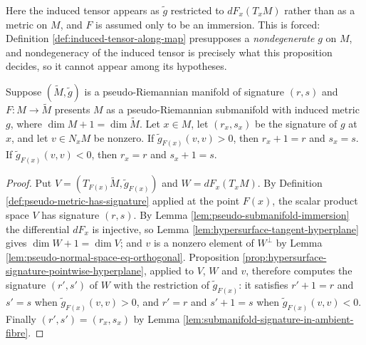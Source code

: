 Here the induced tensor appears as $\tilde{g}$ restricted to $dF_x(T_xM)$ rather than as a metric on $M$, and $F$ is assumed only to be an immersion. This is forced: Definition \ref{def:induced-tensor-along-map} presupposes a \emph{nondegenerate} $g$ on $M$, and nondegeneracy of the induced tensor is precisely what this proposition decides, so it cannot appear among its hypotheses.

\begin{proposition}
\label{prop:hypersurface-signature-at-a-point}
\leanok
{}
Suppose $(\tilde{M},\tilde{g})$ is a pseudo-Riemannian manifold of signature $(r,s)$ and $F : M \to \tilde{M}$ presents $M$ as a pseudo-Riemannian submanifold with induced metric $g$, where $\dim M + 1 = \dim\tilde{M}$. Let $x \in M$, let $(r_x,s_x)$ be the signature of $g$ at $x$, and let $v \in N_xM$ be nonzero. If $\tilde{g}_{F(x)}(v,v) > 0$, then $r_x + 1 = r$ and $s_x = s$. If $\tilde{g}_{F(x)}(v,v) < 0$, then $r_x = r$ and $s_x + 1 = s$.
\end{proposition}

\begin{proof}
\leanok
{}
Put $V = (T_{F(x)}\tilde{M}, \tilde{g}_{F(x)})$ and $W = dF_x(T_xM)$. By Definition \ref{def:pseudo-metric-has-signature} applied at the point $F(x)$, the scalar product space $V$ has signature $(r,s)$. By Lemma \ref{lem:pseudo-submanifold-immersion} the differential $dF_x$ is injective, so Lemma \ref{lem:hypersurface-tangent-hyperplane} gives $\dim W + 1 = \dim V$; and $v$ is a nonzero element of $W^\perp$ by Lemma \ref{lem:pseudo-normal-space-eq-orthogonal}. Proposition \ref{prop:hypersurface-signature-pointwise-hyperplane}, applied to $V$, $W$ and $v$, therefore computes the signature $(r',s')$ of $W$ with the restriction of $\tilde{g}_{F(x)}$: it satisfies $r' + 1 = r$ and $s' = s$ when $\tilde{g}_{F(x)}(v,v) > 0$, and $r' = r$ and $s' + 1 = s$ when $\tilde{g}_{F(x)}(v,v) < 0$. Finally $(r',s') = (r_x,s_x)$ by Lemma \ref{lem:submanifold-signature-in-ambient-fibre}.
\end{proof}

